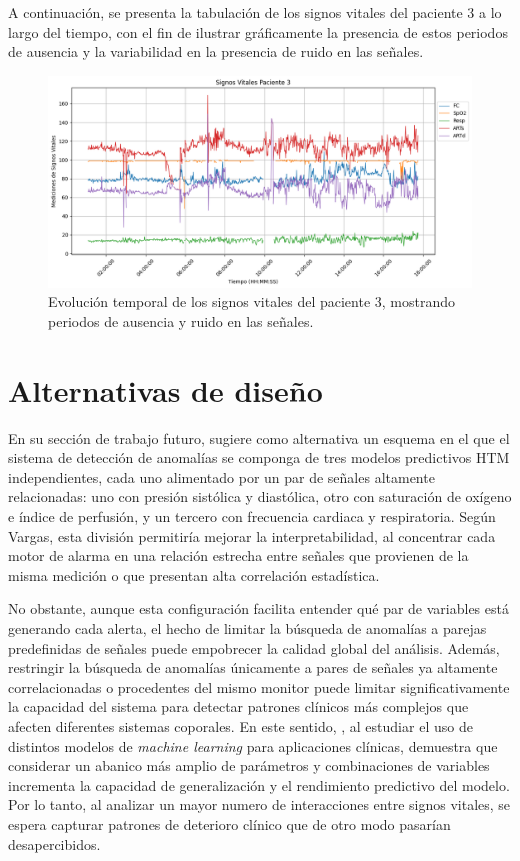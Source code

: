 A continuación, se presenta la tabulación de los signos vitales del paciente 3 a lo largo del tiempo, con el fin de ilustrar gráficamente la presencia de estos periodos de ausencia y la variabilidad en la presencia de ruido en las señales.

\begin{figure}[H]
  \centering
  \includegraphics[width=\textwidth]{Images/SignosVitalesPaciente3.png}
  \caption{Evolución temporal de los signos vitales del paciente 3, mostrando periodos de ausencia y ruido en las señales.}
  \label{fig:signos_vitales_paciente3}
\end{figure}

\section{Alternativas de diseño}

En su sección de trabajo futuro, \textcite{Vargas2023} sugiere como alternativa un esquema en el que el sistema de detección de anomalías se componga de tres modelos predictivos HTM independientes, cada uno alimentado por un par de señales altamente relacionadas: uno con presión sistólica y diastólica, otro con saturación de oxígeno e índice de perfusión, y un tercero con frecuencia cardiaca y respiratoria. Según Vargas, esta división permitiría mejorar la interpretabilidad, al concentrar cada motor de alarma en una relación estrecha entre señales que provienen de la misma medición o que presentan alta correlación estadística.

No obstante, aunque esta configuración facilita entender qué par de variables está generando cada alerta, el hecho de limitar la búsqueda de anomalías a parejas predefinidas de señales puede empobrecer la calidad global del análisis. Además, restringir la búsqueda de anomalías únicamente a pares de señales ya altamente correlacionadas o procedentes del mismo monitor puede limitar significativamente la capacidad del sistema para detectar patrones clínicos más complejos que afecten diferentes sistemas coporales. En este sentido, \textcite{Pieroni2023}, al estudiar el uso de distintos modelos de \textit{machine learning} para aplicaciones clínicas, demuestra que considerar un abanico más amplio de parámetros y combinaciones de variables incrementa la capacidad de generalización y el rendimiento predictivo del modelo. Por lo tanto, al analizar un mayor numero de interacciones entre signos vitales, se espera capturar patrones de deterioro clínico que de otro modo pasarían desapercibidos.

